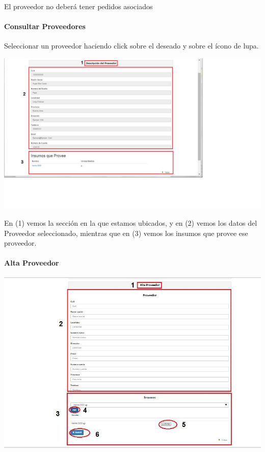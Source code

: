 \documentclass[letterpaper,10pt,english]{sphinxmanual}
\begin{document}
El proveedor no deberá tener pedidos asociados


\paragraph{{}Consultar Proveedores}
\label{proveedores consultarConsult:consultar-proveedores}\label{proveedores consultarConsult::doc}
Seleccionar un proveedor haciendo click sobre el deseado y sobre el ícono de lupa.

\includegraphics{proveedor_detalle.jpg}

En (1) vemos la sección en la que estamos ubicados, y en (2) vemos los datos del Proveedor seleccionado, mientras que en (3) vemos los insumos que provee ese proveedor.


\paragraph{{}Alta Proveedor}
\label{proveedores Alta:alta-proveedor}\label{proveedores Alta::doc}
\includegraphics{proveedor_alta.jpg}
\end{document}
